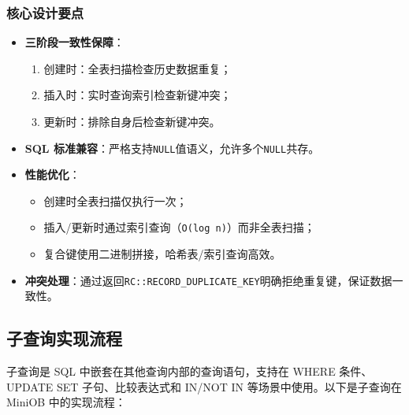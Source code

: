 \documentclass[a4paper, 12pt]{article}
\begin{document}
\subsubsection*{核心设计要点}
\begin{itemize}
    \item \textbf{三阶段一致性保障}：
    \begin{enumerate}
        \item 创建时：全表扫描检查历史数据重复；
        \item 插入时：实时查询索引检查新键冲突；
        \item 更新时：排除自身后检查新键冲突。
    \end{enumerate}
    \item \textbf{SQL 标准兼容}：严格支持\texttt{NULL}值语义，允许多个\texttt{NULL}共存。
    \item \textbf{性能优化}：
    
\begin{itemize}
        \item 创建时全表扫描仅执行一次；
        \item 插入/更新时通过索引查询（\texttt{O(log n)}）而非全表扫描；
        \item 复合键使用二进制拼接，哈希表/索引查询高效。
    \end{itemize}
    \item \textbf{冲突处理}：通过返回\texttt{RC::RECORD\_DUPLICATE\_KEY}明确拒绝重复键，保证数据一致性。
\end{itemize}

\subsection{\heiti 子查询实现流程}
子查询是 SQL 中嵌套在其他查询内部的查询语句，支持在 WHERE 条件、UPDATE SET 子句、比较表达式和 IN/NOT IN 等场景中使用。以下是子查询在 MiniOB 中的实现流程：
\end{document}
